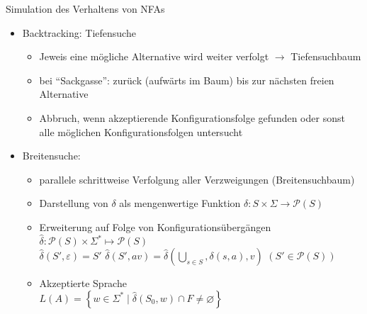 \begin{frame}{Simulation des Verhaltens von NFAs}
	\begin{itemize}
		\item Backtracking: Tiefensuche
		\begin{itemize}
			\item Jeweis eine mögliche Alternative wird weiter verfolgt $\rightarrow$ Tiefensuchbaum
			\item bei "`Sackgasse"': zurück (aufwärts im Baum) bis zur nächsten freien Alternative
			\item Abbruch, wenn akzeptierende Konfigurationsfolge gefunden oder sonst alle möglichen Konfigurationsfolgen untersucht
		\end{itemize}
		\item Breitensuche:
		\begin{itemize}
			\item parallele schrittweise Verfolgung aller Verzweigungen (Breitensuchbaum)
			\item Darstellung von $\delta$ als mengenwertige Funktion $\delta: S \times \Sigma \rightarrow \mathcal{P}(S)$
			\item Erweiterung auf Folge von Konfigurationsübergängen\\
			\quad $\hat{\delta}: \mathcal{P}(S) \times \Sigma^* \mapsto \mathcal{P}(S)$\\
			\quad $\hat{\delta}(S', \varepsilon) = S'$ \quad $\hat{\delta}(S', av)=\hat{\delta}\left(\bigcup_{s \in S}, \delta(s,a),v\right)$ \quad $(S' \in \mathcal{P}(S))$
			\item Akzeptierte Sprache\\
			\quad $L(A)=\left\{w \in \Sigma^* \mid \hat{\delta}(S_0,w)\cap F \neq \varnothing\right\}$
		\end{itemize}
	\end{itemize}
\end{frame}

